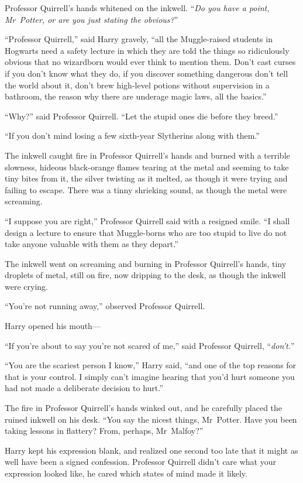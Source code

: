 Professor Quirrell’s hands whitened on the inkwell. “\emph{Do you have a point, Mr~Potter, or are you just stating the obvious?}”

“Professor Quirrell,” said Harry gravely, “all the Muggle-raised students in Hogwarts need a safety lecture in which they are told the things so ridiculously obvious that no wizardborn would ever think to mention them. Don’t cast curses if you don’t know what they do, if you discover something dangerous don’t tell the world about it, don’t brew high-level potions without supervision in a bathroom, the reason why there are underage magic laws, all the basics.”

“Why?” said Professor Quirrell.
“Let the stupid ones die before they breed.”

“If you don’t mind losing a few sixth-year Slytherins along with them.”

The inkwell caught fire in Professor Quirrell’s hands and burned with a terrible slowness, hideous black-orange flames tearing at the metal and seeming to take tiny bites from it, the silver twisting as it melted, as though it were trying and failing to escape. There was a tinny shrieking sound, as though the metal were screaming.

“I suppose you are right,” Professor Quirrell said with a resigned smile.
“I shall design a lecture to ensure that Muggle-borns who are too stupid to live do not take anyone valuable with them as they depart.”

The inkwell went on screaming and burning in Professor Quirrell’s hands, tiny droplets of metal, still on fire, now dripping to the desk, as though the inkwell were crying.

“You’re not running away,” observed Professor Quirrell.

Harry opened his mouth—

“If you’re about to say you’re not scared of me,” said Professor Quirrell, “\emph{don’t.}”

“You are the scariest person I know,” Harry said, “and one of the top reasons for that is your control. I simply can’t imagine hearing that you’d hurt someone you had not made a deliberate decision to hurt.”

The fire in Professor Quirrell’s hands winked out, and he carefully placed the ruined inkwell on his desk.
“You say the nicest things, Mr~Potter. Have you been taking lessons in flattery? From, perhaps, Mr~Malfoy?”

Harry kept his expression blank, and realized one second too late that it might as well have been a signed confession. Professor Quirrell didn’t care what your expression looked like, he cared which states of mind made it likely.

